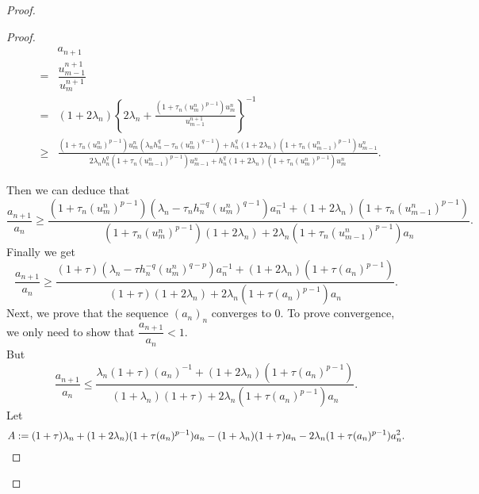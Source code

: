 \documentclass[a4paper,12pt,english,reqno]{smfart}
\begin{document}
\begin{proof}
\begin{proof}
				\begin{eqnarray*}
					&& a_{n+1}\\
					&=&\dfrac{u_{m-1}^{n+1}}{u_{m}^{n+1}}\\
					&= & (1+2\lambda_{n})\left\{2\lambda_{n}+\frac{(1+\tau_{n}(u_{m}^{n})^{p-1})u_{m}^{n}}{u_{m-1}^{n+1}}\right\}^{-1}\\
					
					&\geq & \frac{(1+\tau_{n}(u_{m}^{n})^{p-1})u_{m}^{n}\left(\lambda_{n}h_{n}^{q}-\tau_{n}(u_{m}^{n})^{q-1}\right)+h_{n}^{q}(1+2\lambda_{n})(1+\tau_{n}(u_{m-1}^{n})^{p-1})u_{m-1}^{n}}{2\lambda_{n}h_{n}^{q}(1+\tau_{n}(u_{m-1}^{n})^{p-1})u_{m-1}^{n}+h_{n}^{q}(1+2\lambda_{n})(1+\tau_{n}(u_{m}^{n})^{p-1})u_{m}^{n}}.
				\end{eqnarray*}
			
			Then we can deduce that
			\begin{equation*}
			\frac{a_{n+1}}{a_{n}}
			\geq
			\frac{(1+\tau_{n}(u_{m}^{n})^{p-1})(\lambda_{n}-\tau_{n}h_{n}^{-q}(u_{m}^{n})^{q-1})a_{n}^{-1}+(1+2\lambda_{n})(1+\tau_{n}(u_{m-1}^{n})^{p-1})}{(1+\tau_{n}(u_{m}^{n})^{p-1})(1+2\lambda_{n})+2\lambda_{n}(1+\tau_{n}(u_{m-1}^{n})^{p-1})a_{n}}.
			\end{equation*}
			Finally we get
			\begin{equation}
			\frac{a_{n+1}}{a_{n}}
			\geq
			\frac{(1+\tau)(\lambda_{n}-\tau h_{n}^{-q}(u_{m}^{n})^{q-p})a_{n}^{-1}+(1+2\lambda_{n})(1+\tau(a_{n})^{p-1})}{(1+\tau)(1+2\lambda_{n})+2\lambda_{n}(1+\tau(a_{n})^{p-1})a_{n}}.
			\label{eq414}
			\end{equation}
			Next, we prove that the sequence $(a_{n})_{n}$ converges to 0. To prove convergence, we only need to show that $\dfrac{a_{n+1}}{a_{n}}<1$.\\
			But 
			\begin{equation*}
			\frac{a_{n+1}}{a_{n}}\leq
			\frac{\lambda_{n}(1+\tau)(a_{n})^{-1}+(1+2\lambda_{n})(1+\tau(a_{n})^{p-1})}{(1+\lambda_{n})(1+\tau)+2\lambda_{n}(1+\tau(a_{n})^{p-1})a_{n}}. 
			\end{equation*}
			Let
			\begin{equation*}
			A:=(1+\tau)\lambda_{n}+(1+2\lambda_{n})(1+\tau(a_{n})^{p-1})a_{n}-(1+\lambda_{n})(1+\tau)a_{n}-2\lambda_{n}(1+\tau(a_{n})^{p-1})a_{n}^{2}.\\ 
			

\end{equation*}
\end{proof}
\end{proof}
\end{document}
